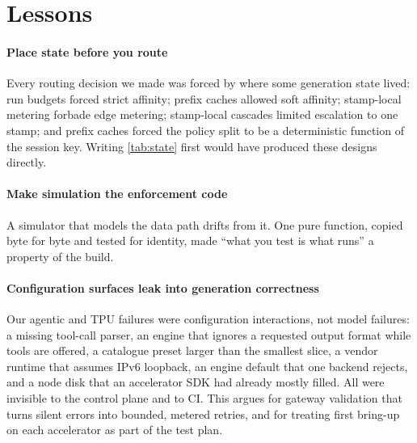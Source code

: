 \documentclass[conference,letterpaper]{IEEEtran}
\begin{document}
\section{Lessons}
\label{sec:lessons}

\paragraph*{Place state before you route}
Every routing decision we made was forced by where some generation state lived: run budgets
forced strict affinity; prefix caches allowed soft affinity; stamp-local metering forbade edge
metering; stamp-local cascades limited escalation to one stamp; and prefix caches forced the
policy split to be a deterministic function of the session key. Writing \cref{tab:state} first
would have produced these designs directly.

\paragraph*{Make simulation the enforcement code}
A simulator that models the data path drifts from it. One pure function, copied byte for byte
and tested for identity, made ``what you test is what runs'' a property of the build.

\paragraph*{Configuration surfaces leak into generation correctness}
Our agentic and TPU failures were configuration interactions, not model failures: a missing
tool-call parser, an engine that ignores a requested output format while tools are offered, a
catalogue preset larger than the smallest slice, a vendor runtime that assumes IPv6 loopback, an
engine default that one backend rejects, and a node disk that an accelerator SDK had already
mostly filled.
All were invisible to the control plane and to CI. This argues for gateway validation that
turns silent errors into bounded, metered retries, and for treating first bring-up on each
accelerator as part of the test plan.
\end{document}
